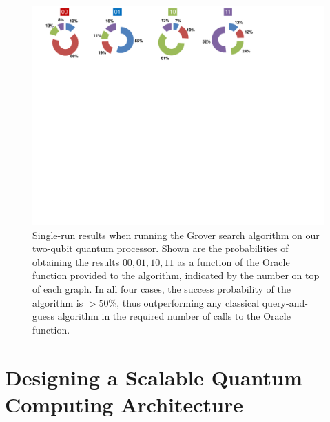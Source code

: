 \begin{figure}[ht!]
		\centering
		\includegraphics[width=1.0\textwidth]{./material/papers/grover/figures/grover_algorithm_single_shot_probabilities}
	\caption[Single-run results of the Grover search algorithm]{Single-run results when running the Grover search algorithm on our two-qubit quantum processor. Shown are the probabilities of obtaining the results $00,01,10,11$ as a function of the Oracle function provided to the algorithm, indicated by the number on top of each graph. In all four cases, the success probability of the algorithm is $> 50 \%$, thus outperforming any classical query-and-guess algorithm in the required number of calls to the Oracle function.}
	\label{fig:grover_single_shot_probabilities}
\end{figure}

\section{Designing a Scalable Quantum Computing Architecture}


